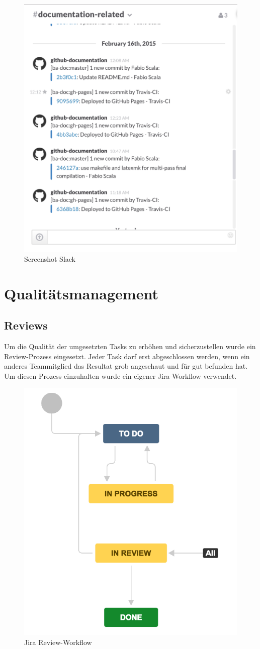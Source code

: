 \begin{figure}[H]
	\centering
	\includegraphics[width=0.5\linewidth]{fig/slack}
	\caption{Screenshot Slack}
	\label{fig:slack}
\end{figure}

\chapter{Qualitätsmanagement}

\section{Reviews}

Um die Qualität der umgesetzten Tasks zu erhöhen und sicherzustellen wurde ein Review-Prozess eingesetzt. Jeder Task darf erst abgeschlossen werden, wenn ein anderes Teammitglied das Resultat grob angeschaut und für gut befunden hat. Um diesen Prozess einzuhalten wurde ein eigener Jira-Workflow verwendet.

\begin{figure}
\centering
\includegraphics[width=0.7\linewidth]{content/projektmanagement/fig/jira-workflow}
\caption{Jira Review-Workflow}
\label{fig:jira-workflow}
\end{figure}


